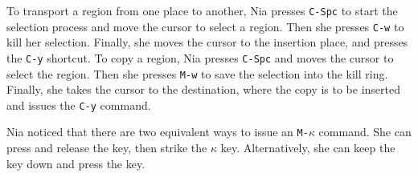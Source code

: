 \documentclass[a4paper,12pt]{book}
\begin{document}
To transport a region from one place to another,
Nia presses \verb|C-Spc| to start
the selection process and move the cursor to select
a region.  Then she presses \verb|C-w| to kill her
selection. Finally, she moves the cursor to the
insertion place, and presses the \verb|C-y| shortcut.
To copy a region, Nia presses \verb|C-Spc| and moves
the cursor to select the region. Then she presses
\verb|M-w| to save the selection into the kill ring. Finally,
she takes the cursor to the destination, where the copy is to
be inserted and issues the \verb|C-y| command.

Nia noticed that there are two equivalent ways to
issue an \verb|M-|$\kappa$ command. She can
press and release the  key, then
strike the  $\kappa$ key. Alternatively, she
can keep the  key down and press
the \keys{$\kappa$} key.
\end{document}
